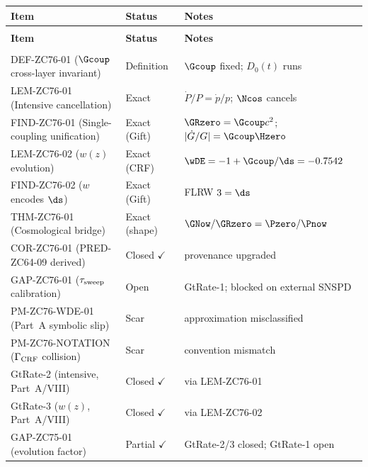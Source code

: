 \documentclass[12pt, a4paper]{article}
\begin{document}
{\small
\setlength{\LTpre}{4pt}\setlength{\LTpost}{4pt}
\renewcommand{\arraystretch}{1.30}
\begin{longtable}{>{\raggedright\arraybackslash}p{5.3cm}
                  >{\centering\arraybackslash}p{2.3cm}
                  >{\raggedright\arraybackslash}p{5.0cm}}
\toprule
\textbf{Item} & \textbf{Status} & \textbf{Notes} \\
\midrule
\endfirsthead
\multicolumn{3}{l}{\small\textit{(continued)}}\\[4pt]
\toprule\textbf{Item}&\textbf{Status}&\textbf{Notes}\\\midrule
\endhead
\midrule\multicolumn{3}{r}{\small\textit{(continues)}}\\
\endfoot
\bottomrule
\endlastfoot
DEF-ZC76-01 ($\Gcoup$ cross-layer invariant)
  & Definition & $\Gcoup$ fixed; $D_0(t)$ runs \\[4pt]
LEM-ZC76-01 (Intensive cancellation)
  & Exact & $\dot{P}/P = \dot{p}/p$; $\Ncos$ cancels \\[4pt]
FIND-ZC76-01 (Single-coupling unification)
  & Exact (Gift) & $\GRzero=\Gcoup c^2$; $|\dot G/G|=\Gcoup\Hzero$ \\[4pt]
LEM-ZC76-02 ($w(z)$ evolution)
  & Exact (CRF) & $\wDE=-1+\Gcoup/\ds=-0.7542$ \\[4pt]
FIND-ZC76-02 ($w$ encodes $\ds$)
  & Exact (Gift) & FLRW $3 = \ds$ \\[4pt]
THM-ZC76-01 (Cosmological bridge)
  & Exact (shape) & $\GNow/\GRzero = \Pzero/\Pnow$ \\[4pt]
COR-ZC76-01 (PRED-ZC64-09 derived)
  & Closed $\checkmark$ & provenance upgraded \\[4pt]
GAP-ZC76-01 ($\tau_{\rm sweep}$ calibration)
  & Open & GtRate-1; blocked on external SNSPD \\[4pt]
PM-ZC76-WDE-01 (Part~A symbolic slip)
  & Scar & approximation misclassified \\[4pt]
PM-ZC76-NOTATION ($\Gamma_{\rm CRF}$ collision)
  & Scar & convention mismatch \\[4pt]
\midrule
GtRate-2 (intensive, Part~A/VIII)
  & Closed $\checkmark$ & via LEM-ZC76-01 \\[4pt]
GtRate-3 ($w(z)$, Part~A/VIII)
  & Closed $\checkmark$ & via LEM-ZC76-02 \\[4pt]
GAP-ZC75-01 (evolution factor)
  & Partial $\checkmark$ & GtRate-2/3 closed; GtRate-1 open \\
\bottomrule
\end{longtable}
}

\end{document}
